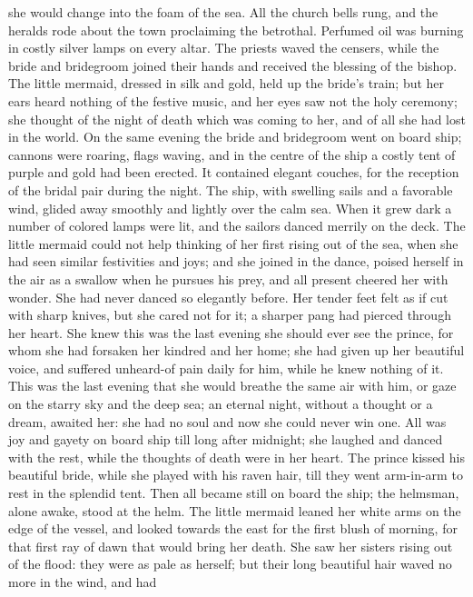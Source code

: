 she would change into the foam of the sea. All the church bells
rung, and the heralds rode about the town proclaiming the betrothal.
Perfumed oil was burning in costly silver lamps on every altar. The
priests waved the censers, while the bride and bridegroom joined their
hands and received the blessing of the bishop. The little mermaid,
dressed in silk and gold, held up the bride's train; but her ears
heard nothing of the festive music, and her eyes saw not the holy
ceremony; she thought of the night of death which was coming to her,
and of all she had lost in the world. On the same evening the bride
and bridegroom went on board ship; cannons were roaring, flags waving,
and in the centre of the ship a costly tent of purple and gold had
been erected. It contained elegant couches, for the reception of the
bridal pair during the night. The ship, with swelling sails and a
favorable wind, glided away smoothly and lightly over the calm sea.
When it grew dark a number of colored lamps were lit, and the
sailors danced merrily on the deck. The little mermaid could not
help thinking of her first rising out of the sea, when she had seen
similar festivities and joys; and she joined in the dance, poised
herself in the air as a swallow when he pursues his prey, and all
present cheered her with wonder. She had never danced so elegantly
before. Her tender feet felt as if cut with sharp knives, but she
cared not for it; a sharper pang had pierced through her heart. She
knew this was the last evening she should ever see the prince, for
whom she had forsaken her kindred and her home; she had given up her
beautiful voice, and suffered unheard-of pain daily for him, while
he knew nothing of it. This was the last evening that she would
breathe the same air with him, or gaze on the starry sky and the
deep sea; an eternal night, without a thought or a dream, awaited her:
she had no soul and now she could never win one. All was joy and
gayety on board ship till long after midnight; she laughed and
danced with the rest, while the thoughts of death were in her heart.
The prince kissed his beautiful bride, while she played with his raven
hair, till they went arm-in-arm to rest in the splendid tent. Then all
became still on board the ship; the helmsman, alone awake, stood at
the helm. The little mermaid leaned her white arms on the edge of
the vessel, and looked towards the east for the first blush of
morning, for that first ray of dawn that would bring her death. She
saw her sisters rising out of the flood: they were as pale as herself;
but their long beautiful hair waved no more in the wind, and had
